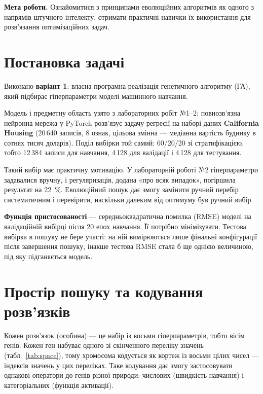 \documentclass[14pt,a4paper]{extreport}
\begin{document}

\textbf{Мета роботи.} Ознайомитися з принципами еволюційних алгоритмів як одного з напрямів штучного інтелекту, отримати практичні навички їх використання для розв'язання оптимізаційних задач.

\section{Постановка задачі}

Виконано \textbf{варіант 1}: власна програмна реалізація генетичного алгоритму (ГА), який підбирає гіперпараметри моделі машинного навчання.

Модель і предметну область узято з лабораторних робіт №1--2: повнозв'язна нейронна мережа у PyTorch розв'язує задачу регресії на наборі даних \textbf{California Housing} (20\,640 записів, 8 ознак, цільова змінна --- медіанна вартість будинку в сотнях тисяч доларів). Поділ вибірки той самий: 60/20/20 зі стратифікацією, тобто 12\,384 записи для навчання, 4\,128 для валідації і 4\,128 для тестування.

Такий вибір має практичну мотивацію. У лабораторній роботі №2 гіперпараметри задавалися вручну, і регуляризація, додана «про всяк випадок», погіршила результат на 22~\%. Еволюційний пошук дає змогу замінити ручний перебір систематичним і перевірити, наскільки далеким від оптимуму був ручний вибір.

\textbf{Функція пристосованості} --- середньоквадратична помилка (RMSE) моделі на валідаційній вибірці після 20 епох навчання. Її потрібно мінімізувати. Тестова вибірка в пошуку не бере участі: на ній вимірюються лише фінальні конфігурації після завершення пошуку, інакше тестова RMSE стала б ще однією величиною, під яку підганяється модель.

\section{Простір пошуку та кодування розв'язків}

Кожен розв'язок (особина) --- це набір із восьми гіперпараметрів, тобто вісім генів. Кожен ген набуває одного зі скінченного переліку значень (табл.~\ref{tab:space}), тому хромосома кодується як кортеж із восьми цілих чисел --- індексів значень у цих переліках. Таке кодування дає змогу застосовувати однакові оператори до генів різної природи: числових (швидкість навчання) і категоріальних (функція активації).
\end{document}
